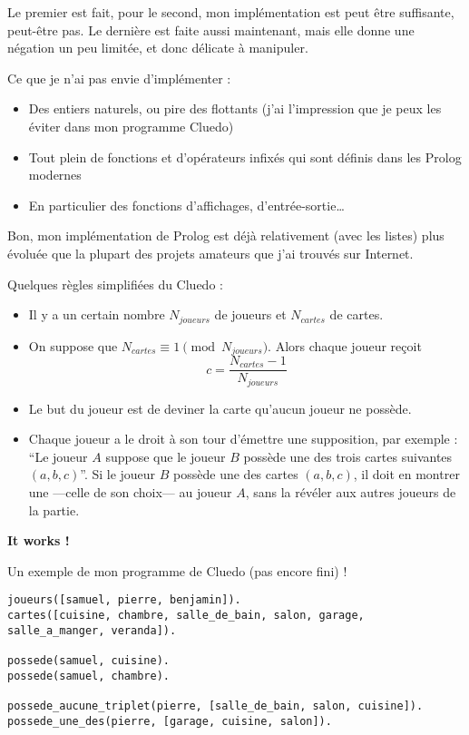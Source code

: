 \documentclass{article}
\begin{document}
Le premier est fait, pour le second, mon implémentation est peut être suffisante, peut-être pas. Le dernière est faite aussi maintenant, mais elle donne une négation un peu limitée, et donc délicate à manipuler.

Ce que je n'ai pas envie d'implémenter :

\begin{itemize}
  \item
    Des entiers naturels, ou pire des flottants (j'ai l'impression que je peux les éviter dans mon programme Cluedo)
  \item
    Tout plein de fonctions et d'opérateurs infixés qui sont définis dans les Prolog modernes
  \item
    En particulier des fonctions d'affichages, d'entrée-sortie\ldots{}
\end{itemize}

Bon, mon implémentation de Prolog est déjà relativement (avec les listes) plus évoluée que la plupart des projets amateurs que j'ai trouvés sur Internet.

Quelques règles simplifiées du Cluedo :

\begin{itemize}
  \item
    Il y a un certain nombre $N_{joueurs}$ de joueurs et $N_{cartes}$ de cartes.
  \item
    On suppose que $N_{cartes} \equiv 1 \pmod {N_{joueurs}}$. Alors chaque joueur reçoit \[c = \frac{N_{cartes}-1}{N_{joueurs}}\]
  \item
    Le but du joueur est de deviner la carte qu'aucun joueur ne possède.
  \item
    Chaque joueur a le droit à son tour d'émettre une supposition, par exemple : ``Le joueur $A$ suppose que le joueur $B$ possède une des trois cartes suivantes $(a, b, c)$''. Si le joueur $B$ possède une des cartes $(a, b, c)$, il doit en montrer une ---celle de son choix--- au joueur $A$, sans la révéler aux autres joueurs de la partie.
\end{itemize}

\textbf{It works !}

Un exemple de mon programme de Cluedo (pas encore fini) !

\begin{verbatim}
joueurs([samuel, pierre, benjamin]).
cartes([cuisine, chambre, salle_de_bain, salon, garage, salle_a_manger, veranda]).

possede(samuel, cuisine).
possede(samuel, chambre).

possede_aucune_triplet(pierre, [salle_de_bain, salon, cuisine]).
possede_une_des(pierre, [garage, cuisine, salon]).
\end{verbatim}
\end{document}
